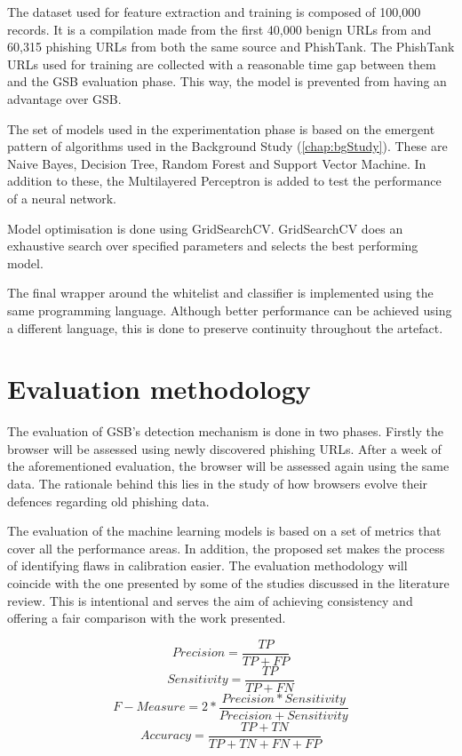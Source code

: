 The dataset used for feature extraction and training is composed of 100,000 records. It is a compilation made from the first 40,000 benign URLs from \cite{Kumar_Siddharth} and 60,315 phishing URLs from both the same source and PhishTank. The PhishTank URLs used for training are collected with a reasonable time gap between them and the GSB evaluation phase. This way, the model is prevented from having an advantage over GSB.

The set of models used in the experimentation phase is based on the emergent pattern of algorithms used in the Background Study (\ref{chap:bgStudy}). These are Naive Bayes, Decision Tree, Random Forest and Support Vector Machine. In addition to these, the Multilayered Perceptron is added to test the performance of a neural network.

Model optimisation is done using GridSearchCV. GridSearchCV does an exhaustive search over specified parameters and selects the best performing model.

The final wrapper around the whitelist and classifier is implemented using the same programming language. Although better performance can be achieved using a different language, this is done to preserve continuity throughout the artefact.

\section{Evaluation methodology}
The evaluation of GSB's detection mechanism is done in two phases. Firstly the browser will be assessed using newly discovered phishing URLs. After a week of the aforementioned evaluation, the browser will be assessed again using the same data. The rationale behind this lies in the study of how browsers evolve their defences regarding old phishing data.

The evaluation of the machine learning models is based on a set of metrics that cover all the performance areas. In addition, the proposed set makes the process of identifying flaws in calibration easier. The evaluation methodology will coincide with the one presented by some of the studies discussed in the literature review. This is intentional and serves the aim of achieving consistency and offering a fair comparison with the work presented.\newline


\begin{equation}
	\label{eq:precision}
	Precision = \frac{TP}{TP+FP}
\end{equation}
\begin{equation}
	\label{eq:sensitivity}
	Sensitivity = \frac{TP}{TP+FN}
\end{equation}
\begin{equation}
	\label{eq:fmeasure}
	F-Measure = 2*\frac{Precision * Sensitivity}{Precision + Sensitivity}
\end{equation}
\begin{equation}
	\label{eq:accuracy}
	Accuracy = \frac{TP+TN}{TP+TN+FN+FP}
\end{equation}
\newline

